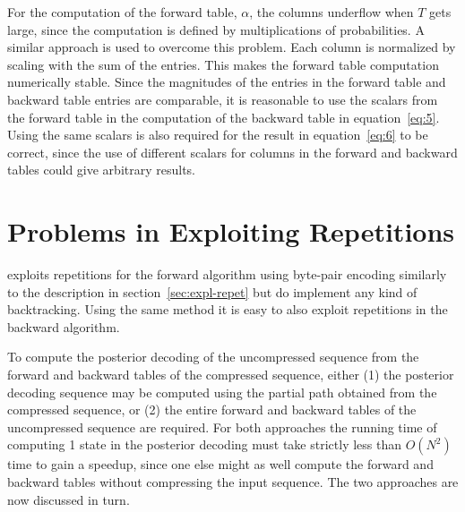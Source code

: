 For the computation of the forward table, $\alpha$, the columns underflow when
$T$ gets large, since the computation is defined by multiplications of
probabilities. A similar approach is used to overcome this problem. Each column
is normalized by scaling with the sum of the entries. This makes the forward
table computation numerically stable. Since the magnitudes of the entries in
the forward table and backward table entries are comparable, it is reasonable
to use the scalars from the forward table in the computation of the backward
table in equation~\eqref{eq:5}. Using the same scalars is also required for the
result in equation~\eqref{eq:6} to be correct, since the use of different
scalars for columns in the forward and backward tables could give arbitrary
results.



\section{Problems in Exploiting Repetitions}
\label{sec:probl-expl-repet}

\citet{sand2013ziphmmlib} exploits repetitions for the forward algorithm using
byte-pair encoding similarly to the description in
section~\ref{sec:expl-repet} but do implement any kind of backtracking. Using
the same method it is easy to also exploit repetitions in the backward
algorithm.

To compute the posterior decoding of the uncompressed sequence from the
forward and backward tables of the compressed sequence, either (1) the
posterior decoding sequence may be computed using the partial path obtained
from the compressed sequence, or (2) the entire forward and backward tables of
the uncompressed sequence are required. For both approaches the running time of
computing 1 state in the posterior decoding must take strictly less than
$O(N^2)$ time to gain a speedup, since one else might as well compute the
forward and backward tables without compressing the input sequence. The two
approaches are now discussed in turn.

